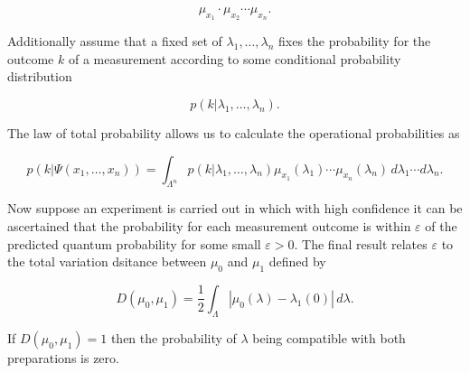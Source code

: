\documentclass[a4paper]{article}
\theoremstyle{definition}
\theoremstyle{plain}
\begin{document}
    \begin{equation}
        \mu_{x_1} \cdot \mu_{x_2} \cdots \mu_{x_n}.
    \end{equation}
   
    Additionally assume that a fixed set of
    $\lambda_1,\ldots,\lambda_n$ fixes the probability for
    the outcome $k$ of a measurement according to some
    conditional probability distribution 

    \begin{equation}
        p(k | \lambda_1,\ldots,\lambda_n).
    \end{equation}

    The law of total probability allows us to calculate the
    operational probabilities as
    
    \begin{equation}
        p(k|\Psi(x_1,\ldots,x_n))
        = \int_{\Lambda^{n}} p(k|\lambda_1,\ldots,\lambda_n)
        \mu_{x_1}(\lambda_1) \cdots \mu_{x_n}(\lambda_n) \,
        d\lambda_1 \cdots d\lambda_n.
    \end{equation}

    Now suppose an experiment is carried out in which with
    high confidence it can be ascertained that the
    probability for each measurement outcome is within
    $\varepsilon$ of the predicted quantum probability for
    some small $\varepsilon > 0$. The final result relates
    $\varepsilon$ to the total variation dsitance between
    $\mu_0$ and $\mu_1$ defined by
    
    \begin{equation}
        D(\mu_0,\mu_1)
        = \frac{1}{2} \int_\Lambda |\mu_0(\lambda) -
        \lambda_1(0)| \, d\lambda.
    \end{equation}

    If $D(\mu_0,\mu_1) = 1$ then the probability of
    $\lambda$ being compatible with both preparations is
    zero. 
    
\end{document}
